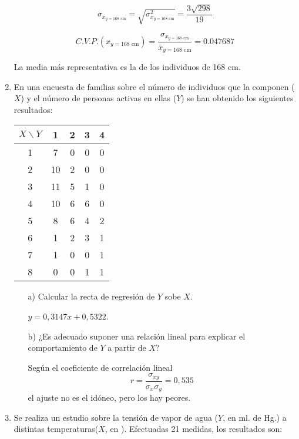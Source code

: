 \documentclass[10pt,a4paper]{article}
\begin{document}
\begin{enumerate}
\begin{equation*}
\sigma_{x_{y = 168 \textrm{ cm}}} = \sqrt{\sigma_{x_{y = 168 \textrm{ cm}}}^2} = \dfrac{3 \sqrt{298}}{19}
\end{equation*}

\begin{equation*}
C.V.P.(x_{y = 168 \textrm{ cm}}) = \dfrac{\sigma_{x_{y = 168 \textrm{ cm}}}}{\bar{x}_{y = 168 \textrm{ cm}}} = 0.047687
\end{equation*}

La media más representativa es la de los individuos de 168 cm.
\newpage

\item En una encuesta de familias sobre el número de individuos que la componen ($X$) y el número de personas activas en ellas ($Y$) se han obtenido los siguientes resultados:

\begin{center}
\begin{tabular}{c|cccc}
$X \backslash Y$ & 1 & 2 & 3 & 4 \\\hline
1 & 7 & 0 & 0 & 0 \\
2 & 10 & 2 & 0 & 0 \\
3 & 11 & 5 & 1 & 0 \\
4 & 10 & 6 & 6 & 0 \\
5 & 8 & 6 & 4 & 2 \\
6 & 1 & 2 & 3 & 1 \\
7 & 1 & 0 & 0 & 1 \\
8 & 0 & 0 & 1 & 1 \\
\end{tabular}
\end{center}

\begin{itemize}
\item[a)]Calcular la recta de regresión de $Y$ sobe $X$.

$y=0,3147x + 0,5322$.

\item[b)]¿Es adecuado suponer una relación lineal para explicar el comportamiento de $Y$ a partir de $X$?

Según el coeficiente de correlación lineal $$r = \frac{\sigma_{xy}}{\sigma_x\sigma_y} = 0,535$$ el ajuste no es el idóneo, pero los hay peores.

\end{itemize}

\newpage

		\item Se realiza un estudio sobre la tensión de vapor de agua ($Y$, en ml. de Hg.) a distintas temperaturas($X$, en \textcelsius{}). Efectuadas 21 medidas, los resultados son:


\end{enumerate}
\end{document}
